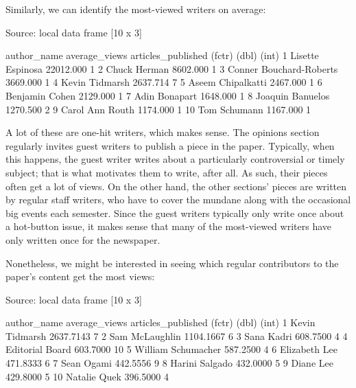 \documentclass[a4paper]{article}
\begin{document}
Similarly, we can identify the most-viewed writers on average:

\begin{Schunk}
\begin{Soutput}
Source: local data frame [10 x 3]

               author_name average_views articles_published
                    (fctr)         (dbl)              (int)
1         Lisette Espinosa     22012.000                  1
2             Chuck Herman      8602.000                  1
3  Conner Bouchard-Roberts      3669.000                  1
4           Kevin Tidmarsh      2637.714                  7
5        Aseem Chipalkatti      2467.000                  1
6           Benjamin Cohen      2129.000                  1
7            Adin Bonapart      1648.000                  1
8         Joaquin Banuelos      1270.500                  2
9         Carol Ann  Routh      1174.000                  1
10            Tom Schumann      1167.000                  1
\end{Soutput}
\end{Schunk}

A lot of these are one-hit writers, which makes sense. The opinions section regularly invites guest writers to publish a piece in the paper. Typically, when this happens, the guest writer writes about a particularly controversial or timely subject; that is what motivates them to write, after all. As such, their pieces often get a lot of views. On the other hand, the other sections' pieces are written by regular staff writers, who have to cover the mundane along with the occasional big events each semester. Since the guest writers typically only write once about a hot-button issue, it makes sense that many of the most-viewed writers have only written once for the newspaper.

Nonetheless, we might be interested in seeing which regular contributors to the paper's content get the most views:

\begin{Schunk}
\begin{Soutput}
Source: local data frame [10 x 3]

          author_name average_views articles_published
               (fctr)         (dbl)              (int)
1      Kevin Tidmarsh     2637.7143                  7
2      Sam McLaughlin     1104.1667                  6
3          Sana Kadri      608.7500                  4
4     Editorial Board      603.7000                 10
5  William Schumacher      587.2500                  4
6       Elizabeth Lee      471.8333                  6
7          Sean Ogami      442.5556                  9
8      Harini Salgado      432.0000                  5
9           Diane Lee      429.8000                  5
10       Natalie Quek      396.5000                  4
\end{Soutput}
\end{Schunk}
\end{document}
